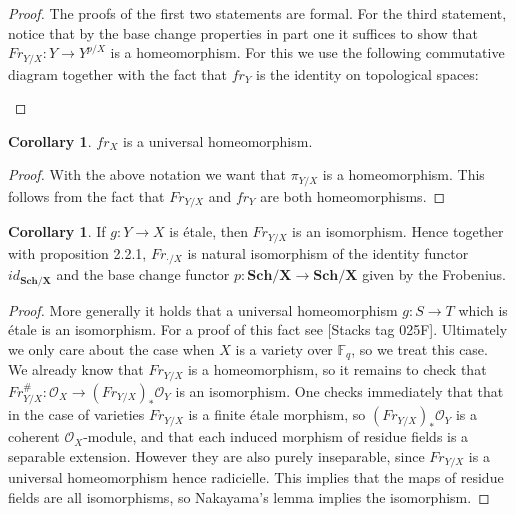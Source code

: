 \documentclass{ucbthesis}
\theoremstyle{definition}
\theoremstyle{theorem}
\newtheorem{cor}[thm]{Corollary}
\begin{document}
\begin{proof}
The proofs of the first two statements are formal. For the third statement, notice that by the base change properties in part one it suffices to show that $Fr_{Y/X}:Y\rightarrow Y^{p/X}$ is a homeomorphism. For this we use the following commutative diagram together with the fact that $fr_{Y}$ is the identity on topological spaces:
\begin{center}
\end{center}
\end{proof}

\begin{cor}
$fr_{X}$ is a universal homeomorphism.
\end{cor}
\begin{proof}
With the above notation we want that $\pi_{Y/X}$ is a homeomorphism. This follows from the fact that $Fr_{Y/X}$ and $fr_{Y}$ are both homeomorphisms. 
\end{proof}


\begin{cor}
If $g:Y\rightarrow X$ is \'{e}tale, then $Fr_{Y/X}$ is an isomorphism. Hence together with proposition 2.2.1, $Fr_{\cdot/X}$ is natural isomorphism of the identity functor $id_{\mathbf{Sch/X}}$ and the base change functor $p:\mathbf{Sch/X} \rightarrow \mathbf{Sch/X}$ given by the Frobenius.
\end{cor}
\begin{proof}
More generally it holds that a universal homeomorphism $g:S \rightarrow T$ which is \'{e}tale is an isomorphism. For a proof of this fact see [Stacks tag 025F]. Ultimately we only care about the case when $X$ is a variety over $\mathbb{F}_{q}$, so we treat this case. We already know that $Fr_{Y/X}$ is a homeomorphism, so it remains to check that $Fr_{Y/X}^{\#}:\mathcal{O}_{X} \rightarrow (Fr_{Y/X})_{*}\mathcal{O}_{Y}$ is an isomorphism. One checks immediately that that in the case of varieties $Fr_{Y/X}$ is a finite \'{e}tale morphism, so $(Fr_{Y/X})_{*}\mathcal{O}_{Y}$ is a coherent $\mathcal{O}_{X}$-module, and that each induced morphism of residue fields is a separable extension. However they are also purely inseparable, since $Fr_{Y/X}$ is a universal homeomorphism hence radicielle. This implies that the maps of residue fields are all isomorphisms, so Nakayama's lemma implies the isomorphism. 
\end{proof}
\end{document}
